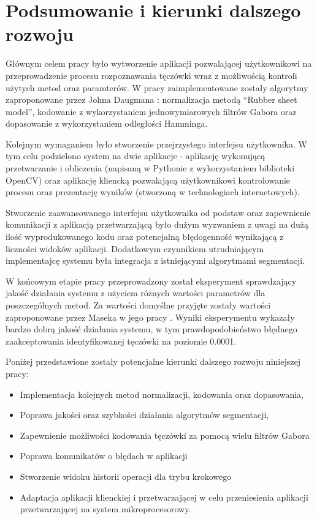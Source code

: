 \chapter{Podsumowanie i kierunki dalszego rozwoju}

Głównym celem pracy było wytworzenie aplikacji pozwalającej użytkownikowi na przeprowadzenie
procesu rozpoznawania tęczówki wraz z możliwością kontroli użytych metod oraz paramterów. W pracy
zaimplementowane zostały algorytmy zaproponowane przez Johna Daugmana \cite{DaugmanHowIrisRecognitionWorks}:
normalizacja metodą ``Rubber sheet model'', kodowanie z wykorzystaniem jednowymiarowych filtrów
Gabora oraz dopasowanie z wykorzystaniem odległości Hamminga.\newline

Kolejnym wymaganiem było stworzenie przejrzystego interfejsu użytkownika. W tym celu podzielono
system na dwie aplikacje - aplikację wykonującą przetwarzanie i obliczenia (napisaną w Pythonie z
wykorzystaniem biblioteki OpenCV) oraz aplikację kliencką pozwalającą użytkownikowi kontrolowanie
procesu oraz prezentację wyników (stworzoną w technologiach internetowych).\newline

Stworzenie zaawansowanego interfejsu użytkownika od podstaw oraz zapewnienie komunikacji z aplikacją
przetwarzającą było dużym wyzwaniem z uwagi na dużą iloś\'c wyprodukowanego kodu oraz potencjalną
błędogennoś\'c wynikającą z liczności widoków aplikacji. Dodatkowym czynnikiem utrudniającym
implementajcę systemu była integracja z istniejącymi algorytmami segmentacji.\newline

W końcowym etapie pracy przeprowadzony został eksperyment sprawdzający jakoś\'c działania
systemu z użyciem różnych wartości parametrów dla poszczególnych metod. Za wartości domyślne
przyjęte zostały wartości zaproponowane przez Maseka w jego pracy \cite{masek}. Wyniki
eksperymentu wykazały bardzo dobrą jakoś\'c działania systemu, w tym prawdopodobieństwo
błędnego zaakceptowania identyfikowanej tęczówki na poziomie 0.0001.\newline

\noindent
Poniżej przedstawione zostały potencjalne kierunki dalszego rozwoju niniejszej pracy:

\begin{itemize}
  \item Implementacja kolejnych metod normalizacji, kodowania oraz dopasowania,
  \item Poprawa jakości oraz szybkości działania algorytmów segmentacji,
  \item Zapewnienie możliwości kodowania tęczówki za pomocą wielu filtrów Gabora
  \item Poprawa komunikatów o błędach w aplikacji
  \item Stworzenie widoku historii operacji dla trybu krokowego
  \item Adaptacja aplikacji klienckiej i przetwarzającej w celu przeniesienia
  aplikacji przetwarzającej na system mikroprocesorowy.
\end{itemize}
